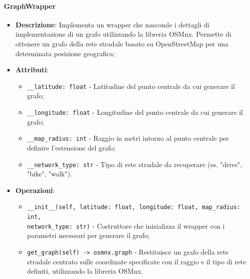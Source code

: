 \documentclass[10pt]{article}
\begin{document}
    \paragraph{GraphWrapper}
    \begin{itemize} 
    \item \textbf{Descrizione}: Implementa un wrapper che nasconde i dettagli di implementazione di un grafo utilizzando la libreria OSMnx. Permette di ottenere un grafo della rete stradale basato su OpenStreetMap per una determinata posizione geografica;
    \item \textbf{Attributi}:
    \begin{itemize}
        \item \texttt{\_\_latitude: float} - Latitudine del punto centrale da cui generare il grafo;
        \item \texttt{\_\_longitude: float} - Longitudine del punto centrale da cui generare il grafo;
        \item \texttt{\_\_map\_radius: int} - Raggio in metri intorno al punto centrale per definire l'estensione del grafo;
        \item \texttt{\_\_network\_type: str} - Tipo di rete stradale da recuperare (es. "drive", "bike", "walk").
    \end{itemize}
    
    \item \textbf{Operazioni}:
    \begin{itemize}
        \item \texttt{\_\_init\_\_(self, latitude: float, longitude: float, map\_radius: int,\\ network\_type: str)} - Costruttore che inizializza il wrapper con i parametri necessari per generare il grafo;
        
        \item \texttt{get\_graph(self) -> osmnx.graph} - Restituisce un grafo della rete stradale centrato sulle coordinate specificate con il raggio e il tipo di rete definiti, utilizzando la libreria OSMnx.
    \end{itemize}
    \end{itemize}
\end{document}
